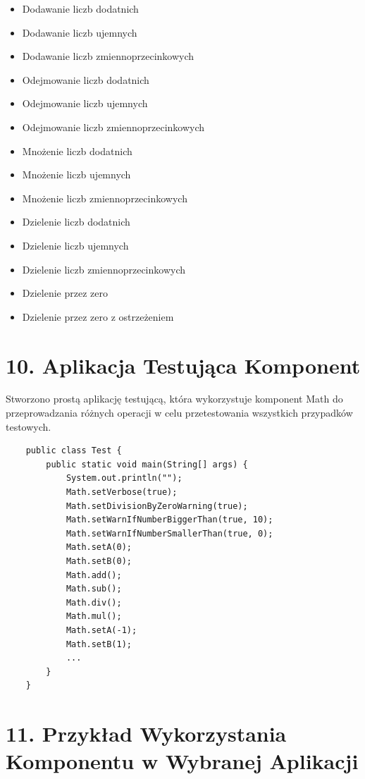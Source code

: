 \documentclass{article}
\begin{document}
\begin{itemize}
    \item Dodawanie liczb dodatnich
    \item Dodawanie liczb ujemnych
    \item Dodawanie liczb zmiennoprzecinkowych
    \item Odejmowanie liczb dodatnich
    \item Odejmowanie liczb ujemnych
    \item Odejmowanie liczb zmiennoprzecinkowych
    \item Mnożenie liczb dodatnich
    \item Mnożenie liczb ujemnych
    \item Mnożenie liczb zmiennoprzecinkowych
    \item Dzielenie liczb dodatnich
    \item Dzielenie liczb ujemnych
    \item Dzielenie liczb zmiennoprzecinkowych
    \item Dzielenie przez zero
    \item Dzielenie przez zero z ostrzeżeniem
\end{itemize}
\newpage
\section*{10. Aplikacja Testująca Komponent}

Stworzono prostą aplikację testującą, która wykorzystuje komponent Math do przeprowadzania różnych operacji w celu przetestowania wszystkich przypadków testowych.

\begin{verbatim}
    public class Test {
        public static void main(String[] args) {
            System.out.println("");
            Math.setVerbose(true);
            Math.setDivisionByZeroWarning(true);
            Math.setWarnIfNumberBiggerThan(true, 10);
            Math.setWarnIfNumberSmallerThan(true, 0);
            Math.setA(0);
            Math.setB(0);
            Math.add();
            Math.sub();
            Math.div();
            Math.mul();
            Math.setA(-1);
            Math.setB(1);
            ...
        }
    }
\end{verbatim}

\section*{11. Przykład Wykorzystania Komponentu w Wybranej Aplikacji}
\end{document}
